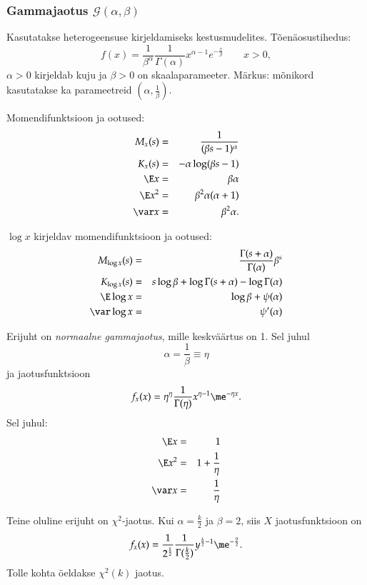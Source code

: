 \documentclass[a4paper]{article}
\numberwithin{equation}{subsection}
\begin{document}
\subsubsection{Gammajaotus $\mathcal{G(\alpha,\beta)}$}
Kasutatakse heterogeensuse kirjeldamiseks kestusmudelites.
Tõenäosustihedus:
\begin{equation}
f(x) = \frac{1}{\beta^\alpha} \frac{1}{\Gamma( \alpha)} x^{\alpha-1}
  e^{-\frac{x}{\beta}} \qquad x > 0,
\end{equation}
$\alpha >0$ kirjeldab kuju ja $\beta>0$ on skaalaparameeter.  Märkus:
mõnikord kasutatakse ka parameetreid $(\alpha,\frac{1}{\beta})$.

Momendifunktsioon ja ootused:
\begin{eqnarray}
M_x (s) &=& \frac{1}{(\beta s - 1)^\alpha}\\
K_x (s) &=& -\alpha \log(\beta s - 1)\\
\E x &=& \beta \alpha \\
\E x^2 &=& \beta^2 \alpha( \alpha + 1) \\
\var x &=& \beta^2 \alpha.
\end{eqnarray}

$\log x$ kirjeldav momendifunktsioon ja ootused:
\begin{eqnarray}
M_{\log x} (s) &=& \frac{\Gamma(s + \alpha)}{\Gamma(\alpha)}\beta^s\\
K_{\log x} (s) &=& s\log \beta + \log \Gamma(s + \alpha) -
  \log\Gamma(\alpha)\\
\E\log x &=& \log\beta + \psi(\alpha)\\
\var\log x &=& \psi'(\alpha)
\end{eqnarray}

Erijuht on \emph{normaalne gammajaotus}, mille keskväärtus on 1.  Sel
juhul 
\begin{equation}
\alpha = \frac{1}{\beta} \equiv \eta
\end{equation}
ja jaotusfunktsioon
\begin{equation}
f_x(x) = \eta^\eta \frac{1}{\Gamma(\eta)} x^{\eta - 1} \me^{-\eta x}.
\end{equation}
Sel juhul:
\begin{eqnarray}
  \E x &=& 1\\
  \E x^2 &=& 1 + \frac{1}{\eta}\\
  \var x &=& \frac{1}{\eta}
\end{eqnarray}

Teine oluline erijuht on $\chi^2$-jaotus.  Kui $\alpha=\frac{k}{2}$ ja
$\beta=2$, siis $X$ jaotusfunktsioon on
\begin{equation}
f_x (x) = \frac{1}{2^\frac{k}{2}} \frac{1}{\Gamma(\frac{k}{2})}
  y^{\frac{k}{2} - 1} \me^{-\frac{y}{2}}.
\end{equation}
Tolle kohta öeldakse $\chi^2(k)$ jaotus.
\end{document}
